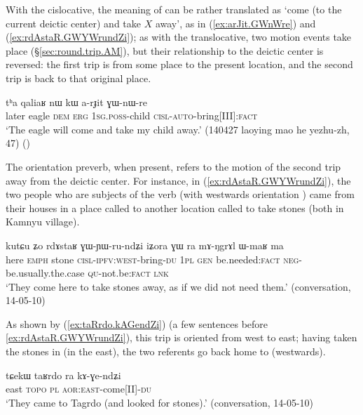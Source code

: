 With the cislocative, the meaning of  can be rather translated as `come (to the current deictic center) and take $X$ away', as in (\ref{ex:arJit.GWnWre}) and (\ref{ex:rdAstaR.GWYWrundZi}); as with the translocative, two motion events take place (§\ref{sec:round.trip.AM}), but their relationship to the deictic center is reversed: the first trip is from some place to the present location, and the second trip is back to that original place.

\begin{exe}
\ex \label{ex:arJit.GWnWre}
\gll  tʰa qaliaʁ nɯ kɯ a-rɟit ɣɯ-nɯ-re \\
later eagle \textsc{dem} \textsc{erg} \textsc{1sg}.\textsc{poss}-child \textsc{cisl}-\textsc{auto}-bring[III]:\textsc{fact} \\
\glt `The eagle will come and take my child away.' (140427 laoying mao he yezhu-zh, 47)
()
\end{exe}

The orientation preverb, when present, refers to the motion of the second trip away from the deictic center. For instance, in (\ref{ex:rdAstaR.GWYWrundZi}), the two people who are subjects of the verb  (with westwards orientation ) came from their houses in a place called  to another location called  to take stones (both in Kamnyu village).

\begin{exe}
\ex \label{ex:rdAstaR.GWYWrundZi}
\gll  kutɕu ʑo rdɤstaʁ ɣɯ-ɲɯ-ru-ndʑi iʑora ɣɯ ra mɤ-ŋgrɤl ɯ-maʁ ma  \\
here \textsc{emph} stone \textsc{cisl}-\textsc{ipfv}:\textsc{west}-bring-\textsc{du} \textsc{1pl} \textsc{gen} be.needed:\textsc{fact} \textsc{neg}-be.usually.the.case \textsc{qu}-not.be:\textsc{fact} \textsc{lnk} \\
\glt `They come here to take stones away, as if we did not need them.' (conversation, 14-05-10)
\end{exe}

As shown by (\ref{ex:taRrdo.kAGendZi}) (a few sentences before \ref{ex:rdAstaR.GWYWrundZi}), this trip is oriented from west to east; having taken the stones in  (in the east), the two referents go back home to  (westwards).

\begin{exe}
\ex \label{ex:taRrdo.kAGendZi}
\gll  tɕekɯ taʁrdo ra kɤ-ɣe-ndʑi \\
east  \textsc{topo} \textsc{pl} \textsc{aor}:\textsc{east}-come[II]-\textsc{du} \\
\glt `They came to Tagrdo (and looked for stones).' (conversation, 14-05-10)
\end{exe}

